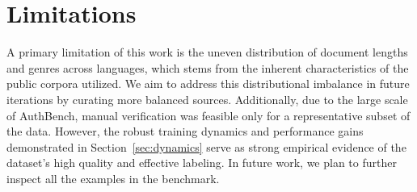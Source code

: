 \documentclass[11pt]{article}
\begin{document}
\section*{Limitations} A primary limitation of this work is the uneven distribution of document lengths and genres across languages, which stems from the inherent characteristics of the public corpora utilized. We aim to address this distributional imbalance in future iterations by curating more balanced sources. Additionally, due to the large scale of AuthBench, manual verification was feasible only for a representative subset of the data. However, the robust training dynamics and performance gains demonstrated in Section~\ref{sec:dynamics} serve as strong empirical evidence of the dataset's high quality and effective labeling.
In future work, we plan to further inspect all the examples in the benchmark.

\end{document}
